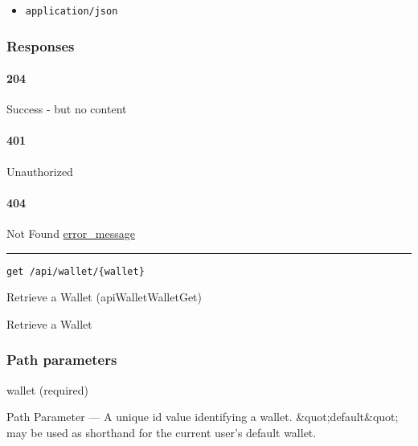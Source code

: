 \begin{itemize}
\tightlist
\item
  \texttt{application/json}
\end{itemize}

\hypertarget{responses-88}{%
\subsubsection{Responses}\label{responses-88}}

\hypertarget{section-287}{%
\paragraph{204}\label{section-287}}

Success - but no content \protect\hyperlink{}{}

\hypertarget{section-288}{%
\paragraph{401}\label{section-288}}

Unauthorized \protect\hyperlink{}{}

\hypertarget{section-289}{%
\paragraph{404}\label{section-289}}

Not Found \protect\hyperlink{error_message}{error\_message}

\begin{center}\rule{0.5\linewidth}{\linethickness}\end{center}

\protect\hypertarget{apiWalletWalletGet}{}{}

\begin{verbatim}
get /api/wallet/{wallet}
\end{verbatim}

Retrieve a Wallet ({apiWalletWalletGet})

Retrieve a Wallet

\hypertarget{path-parameters-45}{%
\subsubsection{Path parameters}\label{path-parameters-45}}

wallet (required)

{Path Parameter} --- A unique id value identifying a wallet.
\&quot;default\&quot; may be used as shorthand for the current user's
default wallet.

